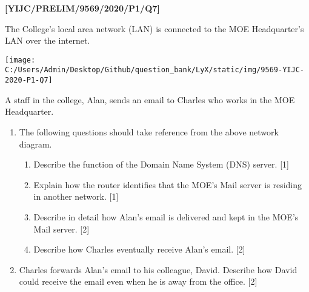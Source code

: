 \item \textbf{{[}YIJC/PRELIM/9569/2020/P1/Q7{]} }

The College\textquoteright s local area network (LAN) is connected
to the MOE Headquarter\textquoteright s LAN over the internet. 
\begin{center}
\texttt{[image: C:/Users/Admin/Desktop/Github/question\_bank/LyX/static/img/9569-YIJC-2020-P1-Q7]}
\par\end{center}

A staff in the college, Alan, sends an email to Charles who works
in the MOE Headquarter.
\begin{enumerate}
\item The following questions should take reference from the above network
diagram. 
\begin{enumerate}
\item Describe the function of the Domain Name System (DNS) server.\hfill{}
{[}1{]}
\item Explain how the router identifies that the MOE's Mail server is residing
in another network.\hfill{} {[}1{]}
\item Describe in detail how Alan's email is delivered and kept in the MOE's
Mail server.\hfill{} {[}2{]}
\item Describe how Charles eventually receive Alan\textquoteright s email.\hfill{}
{[}2{]}
\end{enumerate}
\item Charles forwards Alan\textquoteright s email to his colleague, David.
Describe how David could receive the email even when he is away from
the office. \hfill{}{[}2{]}
\end{enumerate}
